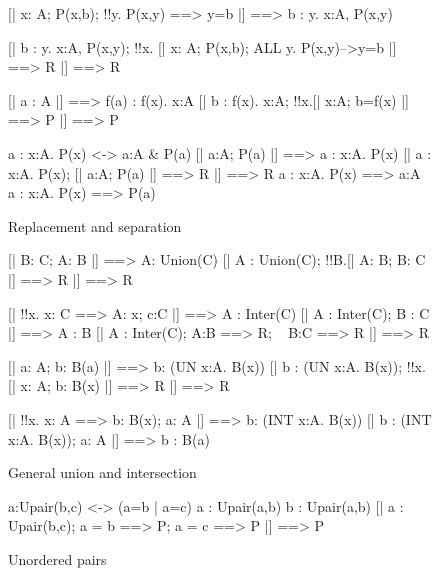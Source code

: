 \begin{figure}[p]
\begin{ttbox}
      [| x: A;  P(x,b);  !!y. P(x,y) ==> y=b |] ==> 
              b : {\ttlbrace}y. x:A, P(x,y){\ttrbrace}

      [| b : {\ttlbrace}y. x:A, P(x,y){\ttrbrace};  
                 !!x. [| x: A;  P(x,b);  ALL y. P(x,y)-->y=b |] ==> R 
              |] ==> R

       [| a : A |] ==> f(a) : {\ttlbrace}f(x). x:A{\ttrbrace}
       [| b : {\ttlbrace}f(x). x:A{\ttrbrace};  
                 !!x.[| x:A;  b=f(x) |] ==> P |] ==> P

     a : {\ttlbrace}x:A. P(x){\ttrbrace} <-> a:A & P(a)
       [| a:A;  P(a) |] ==> a : {\ttlbrace}x:A. P(x){\ttrbrace}
       [| a : {\ttlbrace}x:A. P(x){\ttrbrace};  [| a:A; P(a) |] ==> R |] ==> R
      a : {\ttlbrace}x:A. P(x){\ttrbrace} ==> a:A
      a : {\ttlbrace}x:A. P(x){\ttrbrace} ==> P(a)
\end{ttbox}
\caption{Replacement and separation} \label{zf-lemmas2}
\end{figure}


\begin{figure}
\begin{ttbox}
    [| B: C;  A: B |] ==> A: Union(C)
    [| A : Union(C);  !!B.[| A: B;  B: C |] ==> R |] ==> R

    [| !!x. x: C ==> A: x;  c:C |] ==> A : Inter(C)
    [| A : Inter(C);  B : C |] ==> A : B
    [| A : Inter(C);  A:B ==> R;  ~ B:C ==> R |] ==> R

      [| a: A;  b: B(a) |] ==> b: (UN x:A. B(x))
      [| b : (UN x:A. B(x));  !!x.[| x: A;  b: B(x) |] ==> R 
          |] ==> R

     [| !!x. x: A ==> b: B(x);  a: A |] ==> b: (INT x:A. B(x))
     [| b : (INT x:A. B(x));  a: A |] ==> b : B(a)
\end{ttbox}
\caption{General union and intersection} \label{zf-lemmas3}
\end{figure}



\begin{figure}
\begin{ttbox}
      a:Upair(b,c) <-> (a=b | a=c)
      a : Upair(a,b)
      b : Upair(a,b)
       [| a : Upair(b,c);  a = b ==> P;  a = c ==> P |] ==> P
\end{ttbox}
\caption{Unordered pairs} \label{zf-upair1}
\end{figure}



